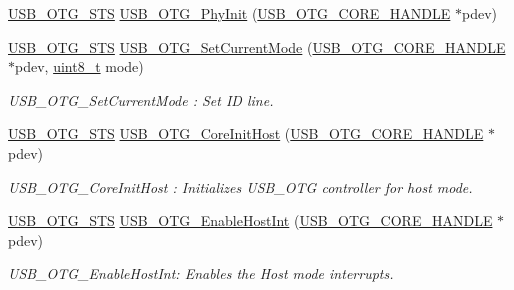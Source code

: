 \begin{DoxyCompactItemize}
\hyperlink{group___u_s_b___c_o_r_e___exported___types_ga8b6504b9af0662f17515795db0f9c8ed}{U\-S\-B\-\_\-\-O\-T\-G\-\_\-\-S\-T\-S} \hyperlink{group___u_s_b___c_o_r_e___exported___functions_prototype_ga0f9c52398716fbeb2141e87a5b883283}{U\-S\-B\-\_\-\-O\-T\-G\-\_\-\-Phy\-Init} (\hyperlink{group___u_s_b___c_o_r_e___exported___types_gaf76054c11eb8a3367907aad7ae700e80}{U\-S\-B\-\_\-\-O\-T\-G\-\_\-\-C\-O\-R\-E\-\_\-\-H\-A\-N\-D\-L\-E} $\ast$pdev)
\item 
\hyperlink{group___u_s_b___c_o_r_e___exported___types_ga8b6504b9af0662f17515795db0f9c8ed}{U\-S\-B\-\_\-\-O\-T\-G\-\_\-\-S\-T\-S} \hyperlink{group___u_s_b___c_o_r_e___exported___functions_prototype_gade650586d970526c5f66288a93bc37a6}{U\-S\-B\-\_\-\-O\-T\-G\-\_\-\-Set\-Current\-Mode} (\hyperlink{group___u_s_b___c_o_r_e___exported___types_gaf76054c11eb8a3367907aad7ae700e80}{U\-S\-B\-\_\-\-O\-T\-G\-\_\-\-C\-O\-R\-E\-\_\-\-H\-A\-N\-D\-L\-E} $\ast$pdev, \hyperlink{stdint_8h_aba7bc1797add20fe3efdf37ced1182c5}{uint8\-\_\-t} mode)
\begin{DoxyCompactList}\small\item\em U\-S\-B\-\_\-\-O\-T\-G\-\_\-\-Set\-Current\-Mode \-: Set I\-D line. \end{DoxyCompactList}\item 
\hyperlink{group___u_s_b___c_o_r_e___exported___types_ga8b6504b9af0662f17515795db0f9c8ed}{U\-S\-B\-\_\-\-O\-T\-G\-\_\-\-S\-T\-S} \hyperlink{group___u_s_b___c_o_r_e___exported___functions_prototype_gae1c6dd456378e903e16375594d2df7c7}{U\-S\-B\-\_\-\-O\-T\-G\-\_\-\-Core\-Init\-Host} (\hyperlink{group___u_s_b___c_o_r_e___exported___types_gaf76054c11eb8a3367907aad7ae700e80}{U\-S\-B\-\_\-\-O\-T\-G\-\_\-\-C\-O\-R\-E\-\_\-\-H\-A\-N\-D\-L\-E} $\ast$pdev)
\begin{DoxyCompactList}\small\item\em U\-S\-B\-\_\-\-O\-T\-G\-\_\-\-Core\-Init\-Host \-: Initializes U\-S\-B\-\_\-\-O\-T\-G controller for host mode. \end{DoxyCompactList}\item 
\hyperlink{group___u_s_b___c_o_r_e___exported___types_ga8b6504b9af0662f17515795db0f9c8ed}{U\-S\-B\-\_\-\-O\-T\-G\-\_\-\-S\-T\-S} \hyperlink{group___u_s_b___c_o_r_e___exported___functions_prototype_gae8de6d34855038ccdb66b7336e9a3020}{U\-S\-B\-\_\-\-O\-T\-G\-\_\-\-Enable\-Host\-Int} (\hyperlink{group___u_s_b___c_o_r_e___exported___types_gaf76054c11eb8a3367907aad7ae700e80}{U\-S\-B\-\_\-\-O\-T\-G\-\_\-\-C\-O\-R\-E\-\_\-\-H\-A\-N\-D\-L\-E} $\ast$pdev)
\begin{DoxyCompactList}\small\item\em U\-S\-B\-\_\-\-O\-T\-G\-\_\-\-Enable\-Host\-Int\-: Enables the Host mode interrupts. \end{DoxyCompactList}\item 

\end{DoxyCompactItemize}
